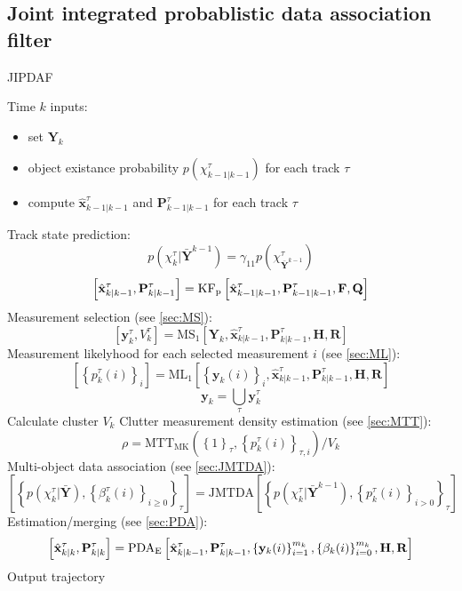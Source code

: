 \subsection{Joint integrated probablistic data association filter}
\begin{algorithm}
    \label{alg:jipdaf}
    \caption{JIPDAF}
    \begin{algorithmic}[1]
        \State Time $k$ inputs:
        \begin{itemize}
            \item set $\mathbf Y_k $
            \item object existance probability $p(\chi^\tau_{k-1|k-1})$ for each track $\tau$
            \item compute $\hat{\mathbf x}^\tau_{k-1|k-1}$ and $\mathbf P^\tau_{k-1|k-1}$ for each track $\tau$
        \end{itemize}
        \State Track state prediction:
        $$p(\chi^\tau_{k} | \bar{\mathbf Y}^{k-1}) = \gamma_{11}p(\chi^\tau_{\bar{\mathbf Y}^{k-1}}) $$
        $$\left[ \hat{\mathbf x}^\tau_{k|k-1}, \mathbf P^\tau_{k|k-1}\right] = \text{KF}_\text p \left[ \hat{\mathbf x}^\tau_{k-1|k-1},\mathbf P^\tau_{k-1|k-1}, \mathbf F, \mathbf Q\right]$$
        \State Measurement selection (see \ref{sec:MS}):
        $$\left[\mathbf y^\tau_k, V^\tau_k\right] = \text{MS}_1\left[\mathbf Y_k, \hat{\mathbf x}^\tau_{k|k-1}, \mathbf P^\tau_{k|k-1}, \mathbf H, \mathbf R\right]$$
        \State Measurement likelyhood for each selected measurement $i$ (see \ref{sec:ML}):
        $$\left[\left\{ p^\tau_k(i)\right\}_i\right] = \text{ML}_1\left[\left\{\mathbf y_k(i)\right\}_i, \hat{\mathbf x}^\tau_{k|k-1}, \mathbf P^\tau_{k|k-1}, \mathbf H, \mathbf R\right]$$
        \EndFor
        $$\mathbf y_k = \bigcup_\tau \mathbf y^\tau_k$$
        \State Calculate cluster $V_k$ 
        \State Clutter measurement density estimation (see \ref{sec:MTT}):
        $$\rho = \text{MTT}_\text{MK}\left( \left\{ 1 \right\}_\tau, \left\{ p^\tau_k(i) \right\}_{\tau,i}\right)/V_k$$
        \EndIf
        \State Multi-object data association (see \ref{sec:JMTDA}):
        $$\left[\left\{ p(\chi^\tau_k | \bar{\mathbf Y}), \left\{\beta_k^\tau(i)\right\}_{i\geq 0}\right\}_\tau\right] = \text{JMTDA}\!\left[\left\{ p(\chi^\tau_{k}|\bar{\mathbf Y}^{k-1}), \left\{ p^\tau_k(i)\right\}_{i>0}\right\}_\tau\right]$$
        \EndFor
        \State Estimation/merging (see \ref{sec:PDA}):
        $$\left[\hat{\mathbf x}^\tau_{k|k}, \mathbf P^\tau_{k|k}\right] = \text{PDA}_\text E \left[\hat{\mathbf x}^\tau_{k|k-1}, \mathbf P^\tau_{k|k-1}, \left\{ \mathbf y_k(i)\right\}^{m_k}_{i=1}, \left\{ \mathbf \beta_k(i)\right\}^{m_k}_{i=0}, \mathbf H, \mathbf R\right]$$
        \State Output trajectory
        \EndFor 
    \end{algorithmic}
\end{algorithm}
